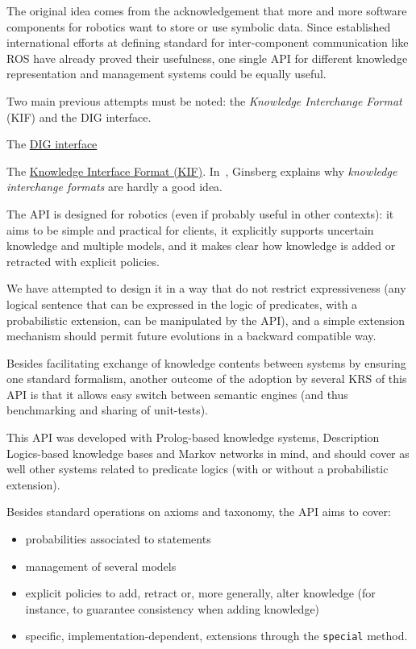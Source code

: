The original idea comes from the acknowledgement that more and more software
components for robotics want to store or use symbolic data. Since established
international efforts at defining standard for inter-component communication
like ROS have already proved their usefulness, one single API for different
knowledge representation and management systems could be equally useful.

Two main previous attempts must be noted: the \emph{Knowledge Interchange
Format} (KIF) and the DIG interface.

The \href{http://dig.sourceforge.net/}{ DIG interface}

The \href{http://logic.stanford.edu/kif/dpans.html}{ Knowledge Interface Format
(KIF)}. In~\cite{Ginsberg1991}, Ginsberg explains why \emph{knowledge
interchange formats} are hardly a good idea.

The API is designed for robotics (even if probably useful in other contexts):
it aims to be simple and practical for clients, it explicitly supports
uncertain knowledge and multiple models, and it makes clear how knowledge is
added or retracted with explicit policies.

We have attempted to design it in a way that do not restrict expressiveness
(any logical sentence that can be expressed in the logic of predicates, with a
probabilistic extension, can be manipulated by the API), and a simple extension
mechanism should permit future evolutions in a backward compatible way.

Besides facilitating exchange of knowledge contents between systems by ensuring
one standard formalism, another outcome of the adoption by several KRS of this
API is that it allows easy switch between semantic engines (and thus
benchmarking and sharing of unit-tests).

This API was developed with Prolog-based knowledge systems, Description
Logics-based knowledge bases and Markov networks in mind, and should cover as
well other systems related to predicate logics (with or without a probabilistic
extension).

Besides standard operations on axioms and taxonomy, the API aims to cover:

\begin{itemize}
    \item  probabilities associated to statements
    \item  management of several models
    \item  explicit policies to add, retract or, more generally, alter 
    knowledge (for instance, to guarantee consistency when adding knowledge)
    \item  specific, implementation-dependent, extensions through the
    \texttt{special} method.
\end{itemize}

